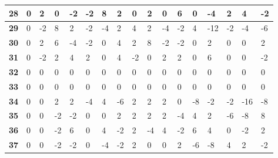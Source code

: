 \begin{longtable}[c]{|l|l|l|l|l|l|l|l|l|l|l|l|l|l|l|l|l|}
\textbf{28} & 0          & 2          & 0          & -2         & -2         & 8          & 2          & 0          & 2          & 0          & 6           & 0           & -4          & 2           & 4           & -2          \\ \hline
\textbf{29} & 0          & -2         & 8          & 2          & -2         & -4         & 2          & 4          & 2          & -4         & -2          & 4           & -12         & -2          & -4          & -6          \\ \hline
\textbf{30} & 0          & 2          & 6          & -4         & -2         & 0          & 4          & 2          & 8          & -2         & -2          & 0           & 2           & 0           & 0           & 2           \\ \hline
\textbf{31} & 0          & -2         & 2          & 4          & 2          & 0          & 4          & -2         & 0          & 2          & 2           & 0           & 6           & 0           & 0           & -2          \\ \hline
\textbf{32} & 0          & 0          & 0          & 0          & 0          & 0          & 0          & 0          & 0          & 0          & 0           & 0           & 0           & 0           & 0           & 0           \\ \hline
\textbf{33} & 0          & 0          & 0          & 0          & 0          & 0          & 0          & 0          & 0          & 0          & 0           & 0           & 0           & 0           & 0           & 0           \\ \hline
\textbf{34} & 0          & 0          & 2          & 2          & -4         & 4          & -6         & 2          & 2          & 2          & 0           & -8          & -2          & -2          & -16         & -8          \\ \hline
\textbf{35} & 0          & 0          & -2         & -2         & 0          & 0          & 2          & 2          & 2          & 2          & -4          & 4           & 2           & -6          & -8          & 8           \\ \hline
\textbf{36} & 0          & 0          & -2         & 6          & 0          & 4          & -2         & 2          & -4         & 4          & -2          & 6           & 4           & 0           & -2          & 2           \\ \hline
\textbf{37} & 0          & 0          & -2         & -2         & 0          & -4         & -2         & 2          & 0          & 0          & 2           & -6          & -8          & 4           & 2           & -2          \\ \hline

\end{longtable}
